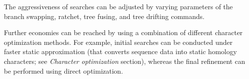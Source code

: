 The aggressiveness of searches can be adjusted by varying parameters of the branch swapping, ratchet, tree fusing, and tree drifting commands.

Further economies can be reached by using a combination of different character optimization methods. For example, initial searches can be conducted under faster static approximation (that converts sequence data into static homology characters; see \emph{Character optimization} section), whereas the final refinement can be performed using direct optimization.

%
%
